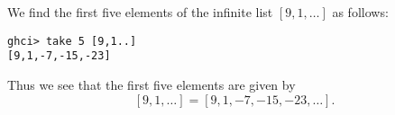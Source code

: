 
We find the first five elements of the infinite list 
$[9, 1, \ldots]$ as follows:
\scriptsize\begin{verbatim}
ghci> take 5 [9,1..]
[9,1,-7,-15,-23]
\end{verbatim}\normalsize
Thus we see that the first five elements are given by
\[
    [9, 1, \ldots] = [9, 1, -7, -15, -23, \ldots].
\]
